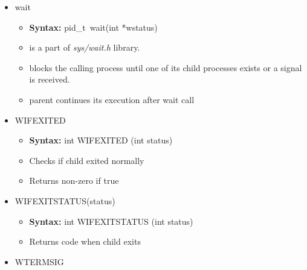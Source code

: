 \documentclass[12pt]{article}
\begin{document}
\begin{itemize}
    \item wait
    \begin{itemize}
        \item \textbf{Syntax:} pid\_t\ wait(int *wstatus)
        \item is a part of \textit{sys/wait.h} library.
        \item blocks the calling process until one of its child processes exists
        or a signal is received.
        \item parent continues its execution after wait call
    \end{itemize}
    \item WIFEXITED
    \begin{itemize}
        \item \textbf{Syntax:} int WIFEXITED (int status)
        \item Checks if child exited normally
        \item Returns non-zero if true
    \end{itemize}
    \item WIFEXITSTATUS(status)
    \begin{itemize}
        \item \textbf{Syntax:} int WIFEXITSTATUS (int status)
        \item Returns code when child exits
    \end{itemize}
    \item WTERMSIG
\end{itemize}
\end{document}
